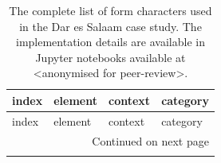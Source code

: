 \begin{longtable}{p{5cm}p{4cm}p{4cm}l}
    \caption{The complete list of form characters used in the Dar es Salaam case study. The implementation details are available
    in Jupyter notebooks available at <anonymised for peer-review>.}
    \label{tab:form_des} \\
    \toprule
                                   index &                         element &                    context &     category \\
    \midrule
    \endfirsthead

    \toprule
                                   index &                         element &                    context &     category \\
    \midrule
    \endhead
    \midrule
    \multicolumn{4}{r}{{Continued on next page}} \\
    \midrule
    \endfoot


\end{longtable}
